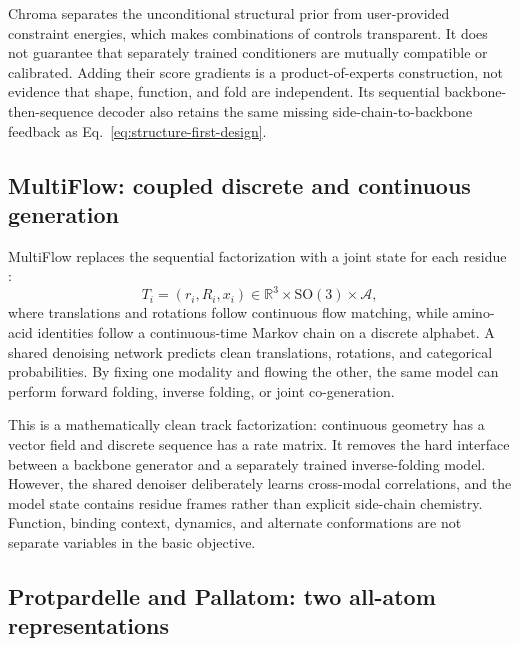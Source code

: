 \documentclass[10pt]{article}
\newcommand{\R}{\mathbb R}
\begin{document}
Chroma separates the unconditional structural prior from user-provided constraint energies, which
makes combinations of controls transparent.  It does not guarantee that separately trained
conditioners are mutually compatible or calibrated.  Adding their score gradients is a
product-of-experts construction, not evidence that shape, function, and fold are independent.  Its
sequential backbone-then-sequence decoder also retains the same missing side-chain-to-backbone
feedback as Eq.~\ref{eq:structure-first-design}.

\subsection{MultiFlow: coupled discrete and continuous generation}

MultiFlow replaces the sequential factorization with a joint state for each residue
\cite{campbell2024}:
\begin{equation}
T_i=(r_i,R_i,x_i)
\in\R^3\times\mathrm{SO}(3)\times\mathcal A,
\label{eq:multiflow-state}
\end{equation}
where translations and rotations follow continuous flow matching, while amino-acid identities
follow a continuous-time Markov chain on a discrete alphabet.  A shared denoising network predicts
clean translations, rotations, and categorical probabilities.  By fixing one modality and flowing
the other, the same model can perform forward folding, inverse folding, or joint co-generation.

This is a mathematically clean track factorization: continuous geometry has a vector field and
discrete sequence has a rate matrix.  It removes the hard interface between a backbone generator
and a separately trained inverse-folding model.  However, the shared denoiser deliberately learns
cross-modal correlations, and the model state contains residue frames rather than explicit
side-chain chemistry.  Function, binding context, dynamics, and alternate conformations are not
separate variables in the basic objective.

\subsection{Protpardelle and Pallatom: two all-atom representations}
\end{document}

